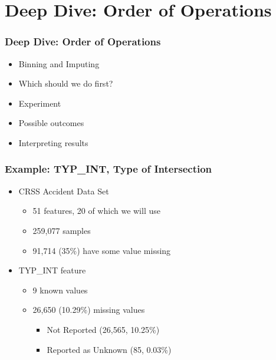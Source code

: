 \section{Deep Dive:  Order of Operations}

\begin{frame}[t]
	\frametitle{Deep Dive:  Order of Operations}
\Large

	\begin{itemize}
		\item Binning and Imputing
		\item Which should we do first?		
		\item Experiment
		\item Possible outcomes
		\item Interpreting results
	\end{itemize}
	
\end{frame}

\begin{frame}[t]
	\frametitle{Example:  TYP\_INT, Type of Intersection}
\Large

	\begin{itemize}
		\item CRSS Accident Data Set
		\begin{itemize}
			\Large
			\item 51 features, 20 of which we will use
			\item 259,077 samples
			\item 91,714 (35\%) have some value missing
		\end{itemize}
		\item TYP\_INT feature
		\begin{itemize}
			\Large
			\item 9 known values	
			
			\vskip 6pt
			\item 26,650 (10.29\%) missing values
			\begin{itemize}
				\Large
				\item Not Reported (26,565, 10.25\%)
				\item Reported as Unknown (85, 0.03\%)
			\end{itemize}
		\end{itemize}
	\end{itemize}
	
\end{frame}

